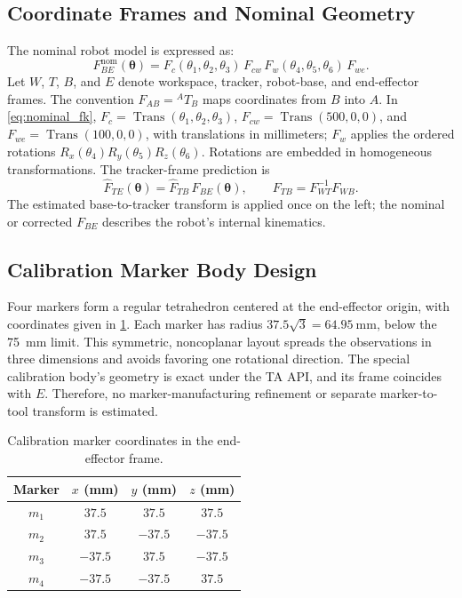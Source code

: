 \documentclass[11pt,letterpaper]{article}
\newcommand{\thv}{\bm{\theta}}
\begin{document}
\subsection{Coordinate Frames and Nominal Geometry}
The nominal robot model is expressed as:
\begin{equation}\label{eq:nominal_fk}
F_{BE}^{\mathrm{nom}}(\thv)
=F_c(\theta_1,\theta_2,\theta_3)\,F_{cw}\,F_w(\theta_4,\theta_5,\theta_6)\,F_{we}.
\end{equation}
Let $W$, $T$, $B$, and $E$ denote workspace, tracker, robot-base, and end-effector frames. The convention $F_{AB}={}^AT_B$ maps coordinates from $B$ into $A$. In \cref{eq:nominal_fk}, $F_c=\operatorname{Trans}(\theta_1,\theta_2,\theta_3)$, $F_{cw}=\operatorname{Trans}(500,0,0)$, and $F_{we}=\operatorname{Trans}(100,0,0)$, with translations in millimeters; $F_w$ applies the ordered rotations $R_x(\theta_4)R_y(\theta_5)R_z(\theta_6)$. Rotations are embedded in homogeneous transformations. The tracker-frame prediction is
\begin{equation}\label{eq:tracker_chain}
\widehat F_{TE}(\thv)=\widehat F_{TB}\,F_{BE}(\thv),
\qquad F_{TB}=F_{WT}^{-1}F_{WB}.
\end{equation}
The estimated base-to-tracker transform is applied once on the left; the nominal or corrected $F_{BE}$ describes the robot's internal kinematics.

\subsection{Calibration Marker Body Design}
Four markers form a regular tetrahedron centered at the end-effector origin, with coordinates given in \cref{tab:markers}. Each marker has radius $37.5\sqrt{3}=\SI{64.95}{\milli\metre}$, below the \SI{75}{\milli\metre} limit. This symmetric, noncoplanar layout spreads the observations in three dimensions and avoids favoring one rotational direction. The special calibration body's geometry is exact under the TA API, and its frame coincides with $E$. Therefore, no marker-manufacturing refinement or separate marker-to-tool transform is estimated.
\begin{table}[!htbp]\centering
\caption{Calibration marker coordinates in the end-effector frame.}\label{tab:markers}
\begin{tabular}{@{}cccc@{}}\toprule
Marker & $x$ (mm) & $y$ (mm) & $z$ (mm)\\\midrule
$m_1$ & $37.5$ & $37.5$ & $37.5$\\
$m_2$ & $37.5$ & $-37.5$ & $-37.5$\\
$m_3$ & $-37.5$ & $37.5$ & $-37.5$\\
$m_4$ & $-37.5$ & $-37.5$ & $37.5$\\\bottomrule
\end{tabular}
\end{table}
\end{document}
